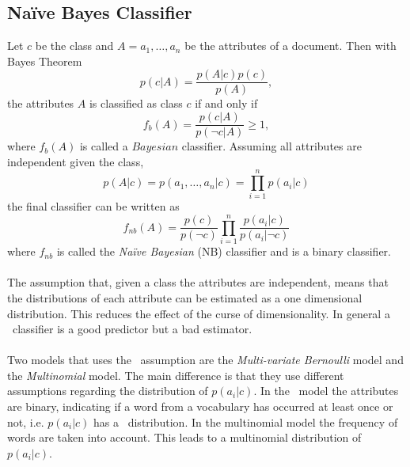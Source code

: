 \subsection{Naïve Bayes Classifier}
Let $c$ be the class and $A = a_1, \dots ,a_n$ be the attributes of a document. Then with Bayes Theorem
\begin{equation}
p(c|A)=\frac{p(A|c)p(c)}{p(A)},
\end{equation}
the attributes $A$ is classified as class $c$ if and only if
\begin{equation}
f_b(A)=\frac{p(c|A)}{p(\neg c|A)} \geq 1,
\end{equation}
where $f_b(A)$ is called a $Bayesian$ classifier. Assuming all attributes are independent given the class, 
\[
p(A|c)=p(a_1,\dots ,a_n | c) = \prod_{i=1}^n p(a_i|c)
\]
the final classifier can be written as
\begin{equation}
f_{nb}(A) = \frac{p(c)}{p(\neg c)}\prod_{i=1}^n\frac{p(a_i|c)}{p(a_i|\neg c)}
\end{equation}
where $f_{nb}$ is called the \emph{Naïve Bayesian} (NB) classifier and is a binary classifier.
\\\\
The assumption that, given a class the attributes are independent, means that the distributions of each attribute can be estimated as a one dimensional distribution. This reduces the effect of the curse of dimensionality. In general a \nb\ classifier is a good predictor but a bad estimator. \cite{Zhang04optimality}
\\\\
Two models that uses the \nb\ assumption are the \emph{Multi-variate Bernoulli} model and the \emph{Multinomial} model. The main difference is that they use different assumptions regarding the distribution of $p(a_i|c)$. In the \bn\ model the attributes are binary, indicating if a word from a vocabulary has occurred at least once or not, i.e. $p(a_i|c)$ has a \bn\ distribution. In the multinomial model the frequency of words are taken into account. This leads to a multinomial distribution of $p(a_i|c)$. \cite{McCallum98acomparison}\cite{bernoulliDistr}\cite{multinomialDistr}